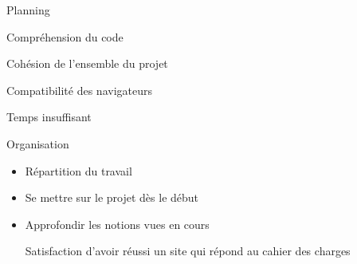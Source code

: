 \documentclass[]{beamer}
\begin{document}
\begin{frame}{Planning}
	\item Compréhension du code
	\item Cohésion de l'ensemble du projet
	\item Compatibilité des navigateurs
	\item Temps insuffisant
\end{frame}

\begin{frame}{Organisation}
  \begin{itemize}
  \item Répartition du travail
  \item Se mettre sur le projet dès le début
  \item Approfondir les notions vues en cours
  \caption{Satisfaction d'avoir réussi un site qui répond au cahier des charges}
\end{itemize}
\end{frame}
\end{document}
